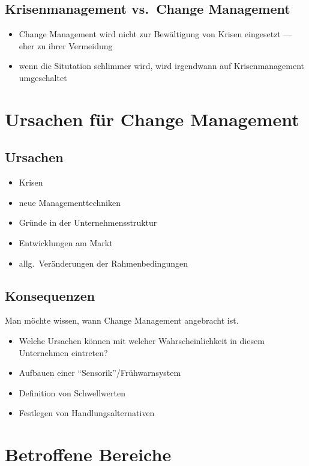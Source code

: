 \documentclass[a4paper, 12pt]{article}
\begin{document}
\subsection{Krisenmanagement vs.\ Change Management}
\begin{itemize}
  \item Change Management wird nicht zur Bewältigung von Krisen eingesetzt --- eher zu ihrer Vermeidung
  \item wenn die Situtation schlimmer wird, wird irgendwann auf Krisenmanagement umgeschaltet
\end{itemize}


\section[Ursachen]{Ursachen für Change Management}


\subsection{Ursachen}
\begin{itemize}
  \item Krisen
  \item neue Managementtechniken
  \item Gründe in der Unternehmensstruktur
  \item Entwicklungen am Markt
  \item allg.\ Veränderungen der Rahmenbedingungen
\end{itemize}


\subsection{Konsequenzen}
Man möchte wissen, wann Change Management angebracht ist.
\begin{itemize}
  \item Welche Ursachen können mit welcher Wahrscheinlichkeit in diesem Unternehmen eintreten?
  \item Aufbauen einer ``Sensorik''/Frühwarnsystem
  \item Definition von Schwellwerten
  \item Festlegen von Handlungsalternativen
\end{itemize}



\section{Betroffene Bereiche}
\end{document}
